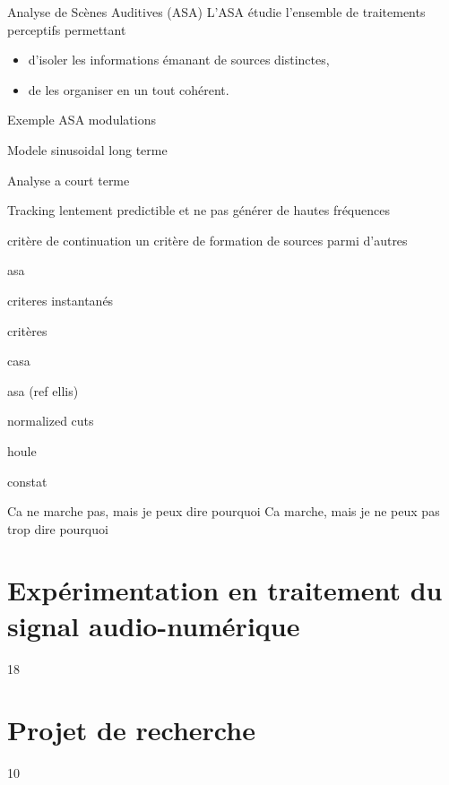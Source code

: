 \documentclass[compress]{beamer}
\begin{document}
\begin{frame}{Analyse de Scènes Auditives (ASA)}
L'ASA étudie l'ensemble de traitements perceptifs permettant
\begin{itemize}
\item d'isoler les informations émanant de sources distinctes,
\item de les organiser en un tout cohérent.
\end{itemize}
\end{frame}


Exemple ASA modulations

Modele sinusoidal long terme

Analyse a court terme

Tracking lentement predictible et ne pas générer de hautes fréquences

critère de continuation un critère de formation de sources parmi d'autres

asa

criteres instantanés

critères 

casa

asa  (ref ellis)

normalized cuts

houle

constat

Ca ne marche pas, mais je peux dire pourquoi
Ca marche, mais je ne peux pas trop dire pourquoi

\section[Expérimentation]{Expérimentation en traitement du signal audio-numérique} 18

\section[Projet]{Projet de recherche} 10


\begin{frame}{} \tableofcontents[currentsection] \end{frame}
\end{document}
